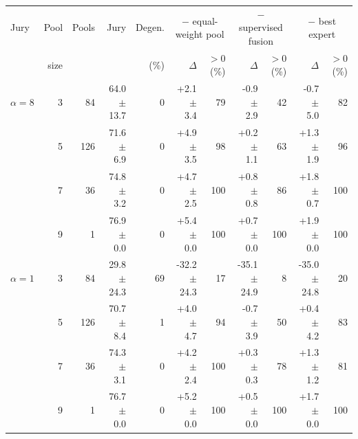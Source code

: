 \begin{tabular}{lrrrrrrrrrr}
\toprule
Jury & Pool & Pools & Jury & Degen. & \multicolumn{2}{c}{$-$ equal-weight pool} & \multicolumn{2}{c}{$-$ supervised fusion} & \multicolumn{2}{c}{$-$ best expert} \\
 & size & & & (\%) & $\Delta$ & $>0$ (\%) & $\Delta$ & $>0$ (\%) & $\Delta$ & $>0$ (\%) \\
\midrule
$\alpha = 8$ & 3 & 84 & 64.0 $\pm$ 13.7 & 0 & +2.1 $\pm$ 3.4 & 79 & -0.9 $\pm$ 2.9 & 42 & -0.7 $\pm$ 5.0 & 82 \\
 & 5 & 126 & 71.6 $\pm$ 6.9 & 0 & +4.9 $\pm$ 3.5 & 98 & +0.2 $\pm$ 1.1 & 63 & +1.3 $\pm$ 1.9 & 96 \\
 & 7 & 36 & 74.8 $\pm$ 3.2 & 0 & +4.7 $\pm$ 2.5 & 100 & +0.8 $\pm$ 0.8 & 86 & +1.8 $\pm$ 0.7 & 100 \\
 & 9 & 1 & 76.9 $\pm$ 0.0 & 0 & +5.4 $\pm$ 0.0 & 100 & +0.7 $\pm$ 0.0 & 100 & +1.9 $\pm$ 0.0 & 100 \\
\midrule
$\alpha = 1$ & 3 & 84 & 29.8 $\pm$ 24.3 & 69 & -32.2 $\pm$ 24.3 & 17 & -35.1 $\pm$ 24.9 & 8 & -35.0 $\pm$ 24.8 & 20 \\
 & 5 & 126 & 70.7 $\pm$ 8.4 & 1 & +4.0 $\pm$ 4.7 & 94 & -0.7 $\pm$ 3.9 & 50 & +0.4 $\pm$ 4.2 & 83 \\
 & 7 & 36 & 74.3 $\pm$ 3.1 & 0 & +4.2 $\pm$ 2.4 & 100 & +0.3 $\pm$ 0.3 & 78 & +1.3 $\pm$ 1.2 & 81 \\
 & 9 & 1 & 76.7 $\pm$ 0.0 & 0 & +5.2 $\pm$ 0.0 & 100 & +0.5 $\pm$ 0.0 & 100 & +1.7 $\pm$ 0.0 & 100 \\
\bottomrule
\end{tabular}

